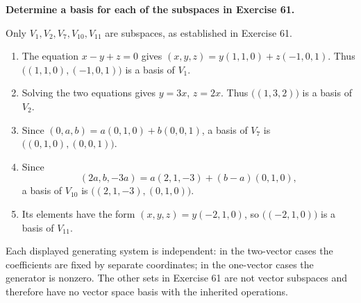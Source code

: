 \providecommand{\rank}{\operatorname{r}}
\providecommand{\RR}{\mathbb R}
\providecommand{\CC}{\mathbb C}
\providecommand{\KK}{\mathbb K}

\setcounter{enumi}{79}
\item {\bfseries\boldmath
Determine a basis for each of the subspaces in Exercise 61.
}

\begin{answer}
Only $V_1,V_2,V_7,V_{10},V_{11}$ are subspaces, as established in Exercise 61.
\begin{enumerate}
\item[$\mathbf{(a)}$] The equation $x-y+z=0$ gives
$(x,y,z)=y(1,1,0)+z(-1,0,1)$.
Thus $\bigl((1,1,0),(-1,0,1)\bigr)$ is a basis of $V_1$.
\item[$\mathbf{(b)}$] Solving the two equations gives $y=3x$, $z=2x$.
Thus $\bigl((1,3,2)\bigr)$ is a basis of $V_2$.
\item[$\mathbf{(g)}$] Since $(0,a,b)=a(0,1,0)+b(0,0,1)$,
a basis of $V_7$ is $\bigl((0,1,0),(0,0,1)\bigr)$.
\item[$\mathbf{(j)}$] Since
\[
 (2a,b,-3a)=a(2,1,-3)+(b-a)(0,1,0),
\]
a basis of $V_{10}$ is $\bigl((2,1,-3),(0,1,0)\bigr)$.
\item[$\mathbf{(k)}$] Its elements have the form $(x,y,z)=y(-2,1,0)$,
so $\bigl((-2,1,0)\bigr)$ is a basis of $V_{11}$.
\end{enumerate}
Each displayed generating system is independent: in the two-vector cases
the coefficients are fixed by separate coordinates; in the one-vector cases
the generator is nonzero. The other sets in Exercise 61 are not vector
subspaces and therefore have no vector space basis with the inherited operations.
\end{answer}
